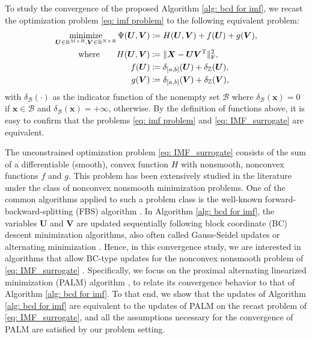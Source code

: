 To study the convergence of the proposed Algorithm \ref{alg: bcd for imf}, we recast the optimization problem \eqref{eq: imf problem} to the following equivalent problem:
\begin{align}
    \begin{split}
        \operatorname*{minimize}_{\bm U \in \mathbb{R}^{M\times R}, \bm V \in \mathbb{R}^{N\times R}} \Psi(\bm U, \bm V) &\coloneqq H(\bm U, \bm V) + f(\bm U) + g(\bm V),\\
        \text{where} \quad~~~ H(\bm U, \bm V) &\coloneqq \|\bm X - \bm U \bm V^{\rm T} \|_{\rm F}^2,\\
        f(\bm U) &\coloneqq \delta_{[a,b]}(\bm U) + \delta_\mathbb Z(\bm U),\\
        g(\bm V) &\coloneqq \delta_{[a,b]}(\bm V) + \delta_\mathbb Z(\bm V),
    \end{split}
    \label{eq: IMF_surrogate}
\end{align}
with $\delta_\mathcal{B}(\cdot)$ as the indicator function of the nonempty set $\mathcal{B}$ where $\delta_\mathcal{B}(\bm x) = 0$ if $\bm x \in \mathcal{B}$ and $\delta_\mathcal{B}(\bm x) = +\infty$, otherwise. By the definition of functions above, it is easy to confirm that the problems \eqref{eq: imf problem} and \eqref{eq: IMF_surrogate} are equivalent.

The unconstrained optimization problem \eqref{eq: IMF_surrogate} consists of the sum of a differentiable (smooth), convex function $H$ with nonsmooth, nonconvex functions $f$ and $g$. This problem has been extensively studied in the literature under the class of nonconvex nonsmooth minimization problems.
One of the common algorithms applied to such a problem class is the well-known forward-backward-splitting (FBS) algorithm \cite{combettes2011proximal,bauschke2017correction}.
In Algorithm \ref{alg: bcd for imf}, the variables $\bm U$ and $\bm V$ are updated sequentially following block coordinate (BC) descent minimization algorithms, also often called Gauss-Seidel updates or alternating minimization \cite{nesterov2012efficiency,attouch2013convergence}.
Hence, in this convergence study, we are interested in algorithms that allow BC-type updates for the nonconvex nonsmooth problem of \eqref{eq: IMF_surrogate} \cite{beck2013convergence,bolte2014proximal}. Specifically, we focus on the proximal alternating linearized minimization (PALM) algorithm \cite{bolte2014proximal}, to relate its convergence behavior to that of Algorithm \ref{alg: bcd for imf}.
To that end, we show that the updates of Algorithm \ref{alg: bcd for imf} are equivalent to the updates of PALM on the recast problem of \eqref{eq: IMF_surrogate}, and all the assumptions necessary for the convergence of PALM are satisfied by our problem setting.

